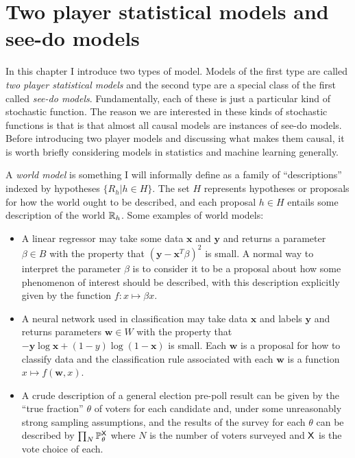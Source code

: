

\chapter{Two player statistical models and see-do models}\label{ch:2p_statmodels}


In this chapter I introduce two types of model. Models of the first type are called \emph{two player statistical models} and the second type are a special class of the first called \emph{see-do models}. Fundamentally, each of these is just a particular kind of stochastic function. The reason we are interested in these kinds of stochastic functions is that is that almost all causal models are instances of see-do models. Before introducing two player models and discussing what makes them causal, it is worth briefly considering models in statistics and machine learning generally.

A \emph{world model} is something I will informally define as a family of ``descriptions'' indexed by hypotheses $\{R_h|h\in H\}$. The set $H$ represents hypotheses or proposals for how the world ought to be described, and each proposal $h\in H$ entails some description of the world $\mathbb{R}_h$. Some examples of world models:

\begin{itemize}
    \item A linear regressor may take some data $\mathbf{x}$ and $\mathbf{y}$ and returns a parameter $\beta\in B$ with the property that $(\mathbf{y}-\mathbf{x}^T \beta)^2$ is small. A normal way to interpret the parameter $\beta$ is to consider it to be a proposal about how some phenomenon of interest should be described, with this description explicitly given by the function $f:x\mapsto \beta x$.
    \item A neural network used in classification may take data $\mathbf{x}$ and labels $\mathbf{y}$ and returns parameters $\mathbf{w}\in W$ with the property that $-\mathbf{y} \log \mathbf{x}+(1-y)\log(1-\mathbf{x})$ is small. Each $\mathbf{w}$ is a proposal for how to classify data and the classification rule associated with each $\mathbf{w}$ is a function $x\mapsto f(\mathbf{w},x)$.
    \item A crude description of a general election pre-poll result can be given by the ``true fraction'' $\theta$ of voters for each candidate and, under some unreasonably strong sampling assumptions, and the results of the survey for each $\theta$ can be described by $\prod_N\mathbb{P}_\theta^{\mathsf{X}}$ where $N$ is the number of voters surveyed and $\mathsf{X}$ is the vote choice of each.
\end{itemize}

